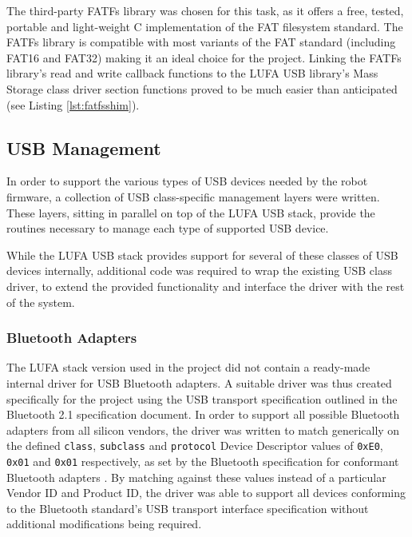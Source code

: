 The third-party FATFs library \cite{fatfs} was chosen for this task, as it offers a free, tested, portable and light-weight C implementation of the FAT filesystem standard. The FATFs library is compatible with most variants of the FAT standard (including FAT16 and FAT32) making it an ideal choice for the project. Linking the FATFs library's read and write callback functions to the LUFA USB library's Mass Storage class driver section functions proved to be much easier than anticipated (see Listing \ref{lst:fatfsshim}).



\FloatBarrier
\subsection{USB Management}

In order to support the various types of USB devices needed by the robot firmware, a collection of USB class-specific management layers were written. These layers, sitting in parallel on top of the LUFA USB stack, provide the routines necessary to manage each type of supported USB device.

While the LUFA USB stack provides support for several of these classes of USB devices internally, additional code was required to wrap the existing USB class driver, to extend the provided functionality and interface the driver with the rest of the system.

\FloatBarrier
\subsubsection{Bluetooth Adapters}

The LUFA stack version used in the project did not contain a ready-made internal driver for USB Bluetooth adapters. A suitable driver was thus created specifically for the project using the USB transport specification outlined in the Bluetooth 2.1 specification document. In order to support all possible Bluetooth adapters from all silicon vendors, the driver was written to match generically on the defined \texttt{class}, \texttt{subclass} and \texttt{protocol} Device Descriptor values of \texttt{0xE0}, \texttt{0x01} and \texttt{0x01} respectively, as set by the Bluetooth specification for conformant Bluetooth adapters \cite{bt2p1specs_usbtransport}. By matching against these values instead of a particular Vendor ID and Product ID, the driver was able to support all devices conforming to the Bluetooth standard's USB transport interface specification without additional modifications being required.


